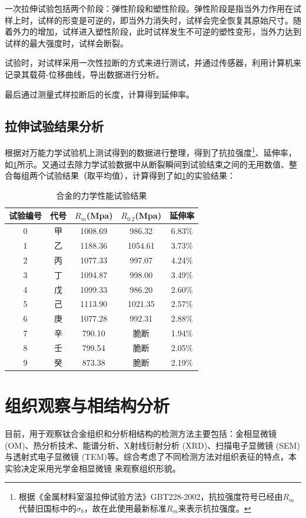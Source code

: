 一次拉伸试验包括两个阶段：弹性阶段和塑性阶段。弹性阶段是指当外力作用在试样上时，试样的形变是可逆的，即当外力消失时，试样会完全恢复其原始尺寸。随着外力的增加，试样进入塑性阶段，此时试样发生不可逆的塑性变形，当外力达到试样的最大强度时，试样会断裂。

试验时，对试样采用一次性拉断的方式来进行测试，并通过传感器，利用计算机来记录其载荷-位移曲线，导出数据进行分析。

最后通过测量式样拉断后的长度，计算得到延伸率。

\subsection{拉伸试验结果分析}
根据对万能力学试验机上测试得到的数据进行整理，得到了抗拉强度\footnote{根据《金属材料室温拉伸试验方法》GBT228-2002，抗拉强度符号已经由$ R_m $代替旧国标中的$ \sigma_b $，故在此使用最新标准$ R_m $来表示抗拉强度。}、延伸率，如\ref{sec:mystrength}所示。又通过去除力学试验数据中从断裂瞬间到试验结束之间的无用数值、整合每组两个试验结果（取平均值），计算得到了如\ref{sec:mystrength}的实验结果：
\begin{table}[htbp]
	\centering
	\caption{\ti 合金的力学性能试验结果}
	\label{sec:mystrength}
	\begin{tabular}{ccccc}
		\toprule
		试验编号& 代号&$ R_m $(Mpa)&$ R_0.2 $(Mpa)&延伸率 \\
		\midrule
		0 & 甲 & 1008.69 &986.32& 6.83$\%$ \\
		1 & 乙 & 1188.36 &1054.61 &3.73$\%$ \\
		2 & 丙 & 1077.33 & 997.07&4.24$\%$ \\
		3 & 丁 & 1094.87 & 998.00&3.49$\%$ \\
		4 & 戊 & 1099.33 &986.20 &2.60$\%$ \\
		5 & 己 & 1113.90 & 1021.35&2.57$\%$ \\
		6 & 庚 & 1077.28 &992.31& 2.88$\%$ \\
		7 & 辛 & 790.10 & 脆断&1.94$\%$ \\
		8 & 壬 & 799.54 &脆断& 2.05$\%$ \\
		9 & 癸 & 873.38 & 脆断&2.19$\%$ \\
		\bottomrule
	\end{tabular}
\end{table}

\section{组织观察与相结构分析}
目前，用于观察钛合金组织和分析相结构的检测方法主要包括：金相显微镜 (OM)、热分析技术、能谱分析、X射线衍射分析 (XRD)、扫描电子显微镜 (SEM)与透射式电子显微镜 (TEM)等。综合考虑了不同检测方法对组织表征的特点，本实验决定采用光学金相显微镜 来观察组织形貌。

